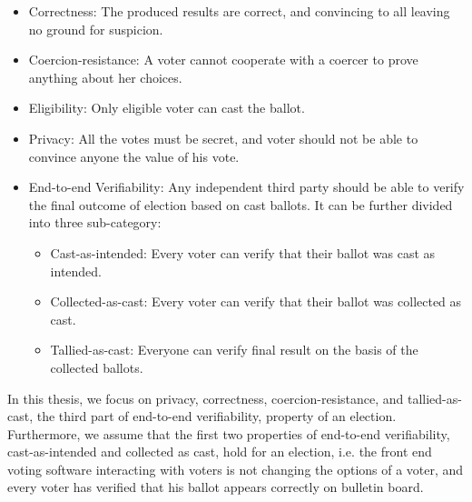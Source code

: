  \begin{itemize}
 
  \item Correctness:
 	The produced results are correct, and convincing to all leaving no  ground for suspicion. 

 \item Coercion-resistance: A voter cannot cooperate with a coercer to prove anything about her choices.
 
 \item Eligibility: Only eligible voter can cast the ballot.
 	
 \item Privacy:
    All the votes must be secret, and voter should not be able to convince anyone the 
    value of his vote.
 
 \item End-to-end Verifiability:
 Any independent third party should be able to verify the final outcome of election based on cast 
 ballots.  It can be further divided into three sub-category:
 
 \begin{itemize}
  \item Cast-as-intended: Every voter can verify that their ballot was cast as
  intended.
  \item Collected-as-cast: Every voter can verify that their ballot was collected as
  cast.
  \item Tallied-as-cast: Everyone can verify final result on the basis of the
  collected ballots.
\end{itemize}
\end{itemize}
	

In this thesis, we focus on privacy, correctness, coercion-resistance, and tallied-as-cast, the third part of end-to-end verifiability, property 
of an election. Furthermore, we assume that the first two properties of end-to-end verifiability, cast-as-intended and 
collected as cast, hold for an election, i.e. the front end voting software interacting with voters is not 
changing the options of a voter, and every voter has verified that his ballot appears correctly on bulletin board. 

